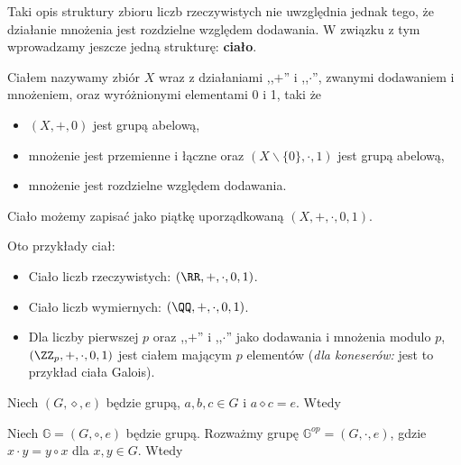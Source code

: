 Taki opis struktury zbioru liczb rzeczywistych nie uwzględnia jednak tego, że działanie mnożenia jest rozdzielne względem dodawania. W związku z tym wprowadzamy jeszcze jedną strukturę: \textbf{ciało}.

Ciałem nazywamy zbiór $X$ wraz z działaniami ,,$+$'' i ,,$\cdot$'', zwanymi dodawaniem i mnożeniem, oraz wyróżnionymi elementami 0 i 1, taki że
\begin{itemize}
    \item $(X,+,0)$ jest grupą abelową,
    \item mnożenie jest przemienne i łączne oraz $(X\backslash\{0\},\cdot,1)$ jest grupą abelową,
    \item mnożenie jest rozdzielne względem dodawania.
\end{itemize}
Ciało możemy zapisać jako piątkę uporządkowaną $(X,+,\cdot,0,1)$.

\begin{example}
    Oto przykłady ciał:
    \begin{itemize}
        \item Ciało liczb rzeczywistych: $(\RR, +, \cdot, 0, 1)$.
        \item Ciało liczb wymiernych: $(\QQ, +, \cdot, 0, 1)$.
        \item Dla liczby pierwszej $p$ oraz ,,$+$'' i ,,$\cdot$'' jako dodawania i mnożenia modulo $p$, $(\ZZ_p,+,\cdot,0,1)$ jest ciałem mającym $p$ elementów (\textit{dla koneserów:} jest to przykład ciała Galois).
    \end{itemize}
\end{example}

\begin{problems}
    \prob Niech $(G, \diamond, e)$ będzie grupą, $a, b, c \in G$ i $a \diamond c = e$. Wtedy

    \prob Niech $\mathbb{G}=(G, \circ, e)$ będzie grupą. Rozważmy grupę $\mathbb{G}^{op}=(G, \cdot, e)$, gdzie $x \cdot y = y \circ x$ dla $x,y \in G$. Wtedy
\end{problems}


